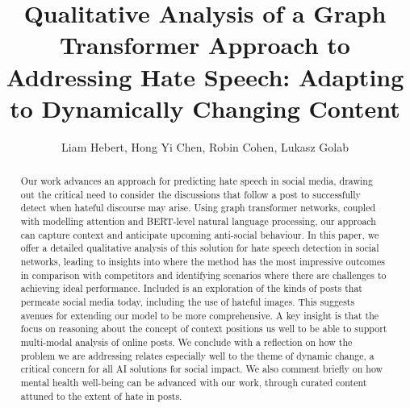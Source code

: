 \documentclass[letterpaper]{article} %
\title{Qualitative Analysis of a Graph Transformer Approach to Addressing Hate Speech:
Adapting to Dynamically Changing Content}
\author{
    Liam Hebert,
    Hong Yi Chen,
    Robin Cohen, 
    Lukasz Golab
}
\begin{document}
\maketitle

\begin{abstract}
Our work advances an approach for predicting hate speech in social media, drawing out the critical need to consider the discussions that follow a post to successfully detect when hateful discourse may arise. Using graph transformer networks, coupled with modelling attention and BERT-level natural language processing, our approach can capture context and anticipate upcoming anti-social behaviour. In this paper, we offer a detailed qualitative analysis of this solution for hate speech detection in social networks, leading to insights into where the method has the most impressive outcomes in comparison with competitors and identifying scenarios where there are challenges to achieving ideal performance. Included is an exploration of the kinds of posts that permeate social media today, including the use of hateful images. This suggests avenues for extending our model to be more comprehensive. A key insight is that the focus on reasoning about the concept of context positions us well to be able to support multi-modal analysis of online posts. We conclude with a reflection on how the problem we are addressing relates especially well to the theme of dynamic change, a critical concern for all AI solutions for social impact. We also comment briefly on how mental health well-being can be advanced with our work, through curated content attuned to the extent of hate in posts.
\end{abstract}
\end{document}
